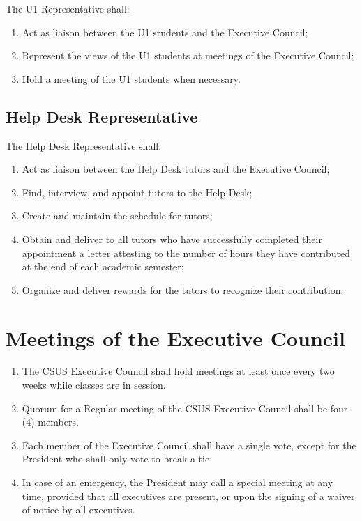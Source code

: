 The U1 Representative shall:

\begin{enumerate}
\def\labelenumi{\arabic{enumi}.}
\item
  Act as liaison between the U1 students and the Executive Council;
\item
  Represent the views of the U1 students at meetings of the Executive
  Council;
\item
  Hold a meeting of the U1 students when necessary.
\end{enumerate}

\subsection{Help Desk Representative}\label{help-desk-representative}

The Help Desk Representative shall:

\begin{enumerate}
\def\labelenumi{\arabic{enumi}.}
\item
  Act as liaison between the Help Desk tutors and the Executive Council;
\item
  Find, interview, and appoint tutors to the Help Desk;
\item
  Create and maintain the schedule for tutors;
\item
  Obtain and deliver to all tutors who have successfully completed their
  appointment a letter attesting to the number of hours they have
  contributed at the end of each academic semester;
\item
  Organize and deliver rewards for the tutors to recognize their
  contribution.
\end{enumerate}

\section{Meetings of the Executive
Council}\label{meetings-of-the-executive-council}

\begin{enumerate}
\def\labelenumi{\arabic{enumi}.}
\item
  The CSUS Executive Council shall hold meetings at least once every two
  weeks while classes are in session.
\item
  Quorum for a Regular meeting of the CSUS Executive Council shall be
  four (4) members.
\item
  Each member of the Executive Council shall have a single vote, except
  for the President who shall only vote to break a tie.
\item
  In case of an emergency, the President may call a special meeting at
  any time, provided that all executives are present, or upon the
  signing of a waiver of notice by all executives.
\end{enumerate}

